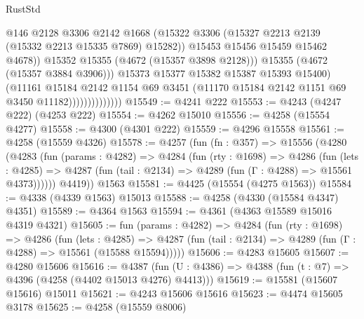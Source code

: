 \begin{lexlean}{RustStd}
\begin{coremodule}
                                      @146
                                      @2128
                                      @3306
                                      @2142
                                      @1668
                                      (@15322
                                        @3306
                                        (@15327 @2213 @2139 (@15332 @2213 @15335 @7869) @15282))
                                      @15453
                                      @15456
                                      @15459
                                      @15462
                                      @4678))
                                  @15352
                                  @15355
                                  (@4672 (@15357 @3898 @2128)))
                                @15355
                                (@4672 (@15357 @3884 @3906)))
                              @15373
                              @15377
                              @15382
                              @15387
                              @15393
                              @15400)
                            (@11161
                              @15184
                              @2142
                              @1154
                              @69
                              @3451
                              (@11170 @15184 @2142 @1151 @69 @3450 @11182))))))))))))))
@15549 := @4241 @222
@15553 := @4243 (@4247 @222) (@4253 @222)
@15554 := @4262 @15010
@15556 := @4258 (@15554 @4277)
@15558 := @4300 (@4301 @222)
@15559 := @4296 @15558
@15561 := @4258 (@15559 @4326)
@15578 := @4257
    (fun (fn : @357) =>
    @15556
      (@4280
        (@4283
          (fun (params : @4282) =>
          @4284
            (fun (rty : @1698) =>
            @4286
              (fun (lets : @4285) =>
              @4287 (fun (tail : @2134) => @4289 (fun (Γ : @4288) => @15561 @4373))))))
        @4419))
    @1563
@15581 := @4425 (@15554 (@4275 @1563))
@15584 := @4338 (@4339 @1563) @15013
@15588 := @4258 (@4330 (@15584 @4347) @4351)
@15589 := @4364 @1563
@15594 := @4361 (@4363 @15589 @15016 @4319 @4321)
@15605 := fun (params : @4282) =>
  @4284
    (fun (rty : @1698) =>
    @4286
      (fun (lets : @4285) =>
      @4287 (fun (tail : @2134) => @4289 (fun (Γ : @4288) => @15561 (@15588 @15594)))))
@15606 := @4283 @15605
@15607 := @4280 @15606
@15616 := @4387
    (fun (U : @4386) => @4388 (fun (t : @7) => @4396 (@4258 (@4402 @15013 @4276) @4413)))
@15619 := @15581 (@15607 @15616) @15011
@15621 := @4243 @15606 @15616
@15623 := @4474 @15605 @3178
@15625 := @4258 (@15559 @8006)

\end{coremodule}
\end{lexlean}
